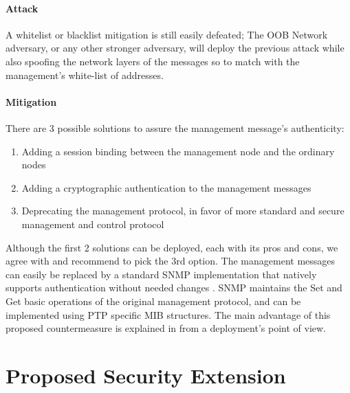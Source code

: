 \documentclass[11pt]{article}
\begin{document}
\paragraph{Attack}

A whitelist or blacklist mitigation is still easily defeated; The OOB Network adversary, or any other stronger adversary, will deploy the previous attack while also spoofing the network layers of the messages so to match with the management's white-list of addresses.



\paragraph{Mitigation}\label{manag:scenrio2mit}

There are 3 possible solutions to assure the management message's authenticity:

\begin{enumerate}

  \item Adding a session binding between the management node and the ordinary nodes

  \item Adding a cryptographic authentication to the management messages

  \item Deprecating the management protocol, in favor of more standard and secure management and control protocol

\end{enumerate}

Although the first 2 solutions can be deployed, each with its pros and cons, we agree with \cite{PTP_Deploy} and recommend to pick the 3rd option. The management messages can easily be replaced by a standard SNMP implementation that natively supports authentication without needed changes \cite{SNMPv3}. SNMP maintains the Set and Get basic operations of the original management protocol, and can be implemented using PTP specific MIB structures. The main advantage of this proposed countermeasure is explained in \cite{PTP_Deploy} from a deployment's point of view.





\section{Proposed Security Extension}\label{Solution}
\end{document}
